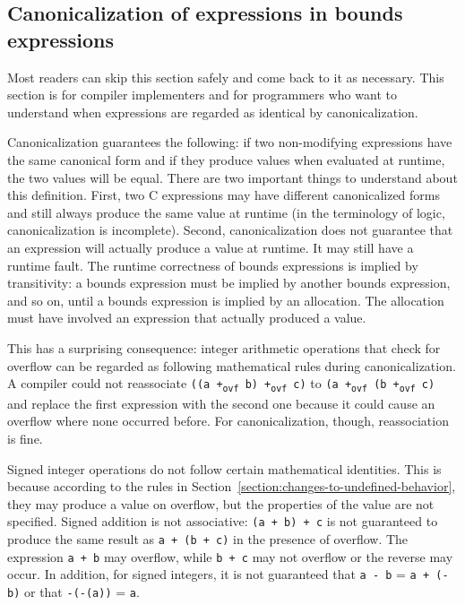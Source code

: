 \subsection{Canonicalization of expressions in bounds expressions}
\label{section:canonicalization}

Most readers can skip this section safely and come back to it as
necessary. This section is for compiler implementers and for programmers
who want to understand when expressions are regarded as identical by
canonicalization.

Canonicalization guarantees the following: if two non-modifying
expressions have the same canonical form and if they produce values when
evaluated at runtime, the two values will be equal. There are two
important things to understand about this definition. First, two C
expressions may have different canonicalized forms and still always
produce the same value at runtime (in the terminology of logic,
canonicalization is incomplete). Second, canonicalization does not
guarantee that an expression will actually produce a value at runtime.
It may still have a runtime fault. The runtime correctness of bounds
expressions is implied by transitivity: a bounds expression must be
implied by another bounds expression, and so on, until a bounds
expression is implied by an allocation. The allocation must have
involved an expression that actually produced a value.

This has a surprising consequence: integer arithmetic operations that
check for overflow can be regarded as following mathematical rules
during canonicalization. A compiler could not reassociate \texttt{((a
+\textsubscript{ovf} b) +\textsubscript{ovf} c)} to \texttt{(a
+\textsubscript{ovf} (b +\textsubscript{ovf} c)} and replace the first
expression with the second one because it could cause an overflow where
none occurred before. For canonicalization, though, reassociation is
fine.

Signed integer operations do not follow certain mathematical identities.
This is because according to the rules in 
Section~\ref{section:changes-to-undefined-behavior}, they may produce
a value on overflow, but the properties of the value are not specified.
Signed addition is not associative: \texttt{(a + b) + c} is not
guaranteed to produce the same result as \texttt{a + (b + c)} in the
presence of overflow. The expression \texttt{a + b} may overflow, while
\texttt{b + c} may not overflow or the reverse may occur. In addition,
for signed integers, it is not guaranteed that \texttt{a - b} =
\texttt{a + (-b)} or that \texttt{-(-(a))} = \texttt{a}.

